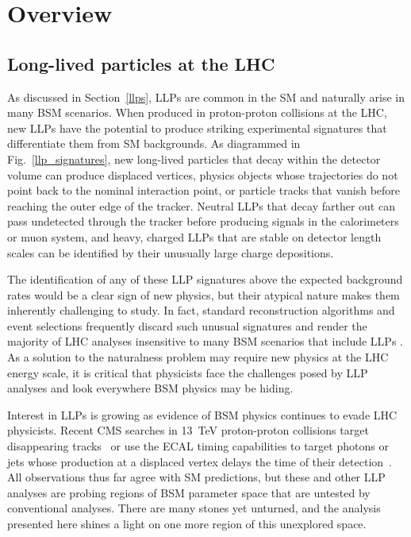 \section{Overview}
\label{overview}
\subsection{Long-lived particles at the LHC}
As discussed in Section~\ref{llps}, LLPs are common in the SM and naturally arise in many BSM scenarios. When produced in proton-proton collisions at the LHC, new LLPs have the potential to produce striking experimental signatures that differentiate them from SM backgrounds. As diagrammed in Fig.~\ref{llp_signatures}, new long-lived particles that decay within the detector volume can produce displaced vertices, physics objects whose trajectories do not point back to the nominal interaction point, or particle tracks that vanish before reaching the outer edge of the tracker. Neutral LLPs that decay farther out can pass undetected through the tracker before producing signals in the calorimeters or muon system, and heavy, charged LLPs that are stable on detector length scales can be identified by their unusually large charge depositions.



The identification of any of these LLP signatures above the expected background rates would be a clear sign of new physics, but their atypical nature makes them inherently challenging to study. In fact, standard reconstruction algorithms and event selections frequently discard such unusual signatures and render the majority of LHC analyses insensitive to many BSM scenarios that include LLPs \cite{llp_whitepaper}. As a solution to the naturalness problem may require new physics at the LHC energy scale, it is critical that physicists face the challenges posed by LLP analyses and look everywhere BSM physics may be hiding.

Interest in LLPs is growing as evidence of BSM physics continues to evade LHC physicists. Recent CMS searches in \SI{13}{\TeV} proton-proton collisions target disappearing tracks~\cite{disappearing_tracks} or use the ECAL timing capabilities to target photons or jets whose production at a displaced vertex delays the time of their detection~\cite{delayed_photons, delayed_jets}. All observations thus far agree with SM predictions, but these and other LLP analyses are probing regions of BSM parameter space that are untested by conventional analyses. There are many stones yet unturned, and the analysis presented here shines a light on one more region of this unexplored space.

